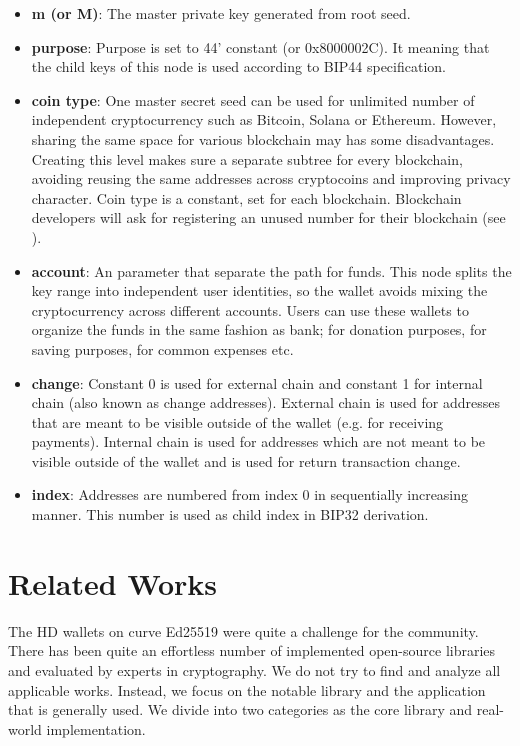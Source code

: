 \begin{itemize}
    \item \textbf{m (or M)}: The master private key generated from root seed.
    \item \textbf{purpose}: Purpose is set to 44' constant (or 0x8000002C). It meaning that the child keys of this node is used according to BIP44 specification.
    \item \textbf{coin type}: One master secret seed can be used for unlimited number of independent cryptocurrency such as Bitcoin, Solana or Ethereum. However, sharing the same space for various blockchain may has some disadvantages. Creating this level makes sure a separate subtree for every blockchain, avoiding reusing the same addresses across cryptocoins and improving privacy character. Coin type is a constant, set for each blockchain. Blockchain developers will ask for registering an unused number for their blockchain (see \cite{bip44}).
    \item \textbf{account}: An parameter that separate the path for funds. This node splits the key range into independent user identities, so the wallet avoids mixing the cryptocurrency across different accounts. Users can use these wallets to organize the funds in the same fashion as bank; for donation purposes, for saving purposes, for common expenses etc.
    \item \textbf{change}: Constant 0 is used for external chain and constant 1 for internal chain (also known as change addresses). External chain is used for addresses that are meant to be visible outside of the wallet (e.g. for receiving payments). Internal chain is used for addresses which are not meant to be visible outside of the wallet and is used for return transaction change.
    \item \textbf{index}: Addresses are numbered from index 0 in sequentially increasing manner. This number is used as child index in BIP32 derivation.

\end{itemize}


\section{Related Works}
\label{related}

The HD wallets on curve Ed25519 were quite a challenge for the community. There has been quite an effortless number of implemented open-source libraries and evaluated by experts in cryptography. We do not try to find and analyze all applicable works. Instead, we focus on the notable library and the application that is generally used. We divide into two categories as the core library and real-world implementation.

